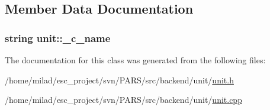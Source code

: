 \begin{DoxyCode}
{}
\end{DoxyCode}


\subsection{Member Data Documentation}
\hypertarget{classunit_aedc80782c1a267e6141603399d9857b5}{
\subsubsection[{\_\-c\_\-name}]{\setlength{\rightskip}{0pt plus 5cm}string {\bf unit::\_\-c\_\-name}}}
\label{classunit_aedc80782c1a267e6141603399d9857b5}


The documentation for this class was generated from the following files:\begin{DoxyCompactItemize}
\item 
/home/milad/esc\_\-project/svn/PARS/src/backend/unit/\hyperlink{unit_2unit_8h}{unit.h}\item 
/home/milad/esc\_\-project/svn/PARS/src/backend/unit/\hyperlink{unit_2unit_8cpp}{unit.cpp}\end{DoxyCompactItemize}
